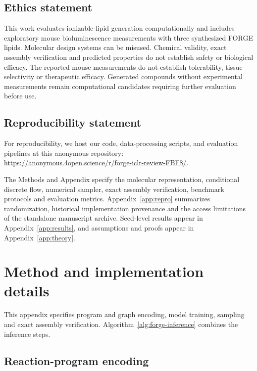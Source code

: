 \documentclass{article}
\theoremstyle{definition}
\begin{document}
\subsection*{Ethics statement}
This work evaluates ionizable-lipid generation computationally and includes exploratory mouse
bioluminescence measurements with three synthesized FORGE lipids. Molecular design systems can be misused. Chemical validity,
exact assembly verification and predicted
properties do not establish safety or biological efficacy. The reported mouse measurements do not
establish tolerability, tissue selectivity or therapeutic efficacy. Generated compounds without
experimental measurements remain computational candidates requiring further evaluation before use.

\subsection*{Reproducibility statement}
For reproducibility, we host our code, data-processing scripts, and evaluation pipelines at this
anonymous repository:\\
\url{https://anonymous.4open.science/r/forge-iclr-review-FBF8/}.

The Methods and Appendix specify the molecular representation, conditional discrete flow, numerical
sampler, exact assembly verification, benchmark protocols and evaluation metrics.
Appendix~\ref{app:repro} summarizes randomization, historical implementation provenance and the
access limitations of the standalone manuscript archive. Seed-level results appear in
Appendix~\ref{app:results}, and assumptions and proofs appear in Appendix~\ref{app:theory}.




\clearpage
\appendix

\section{Method and implementation details}
\label{app:forge}

This appendix specifies program and graph encoding, model training, sampling and exact assembly
verification. Algorithm~\ref{alg:forge-inference} combines the inference steps.

\subsection{Reaction-program encoding}
\label{app:program-encoding}
\end{document}
